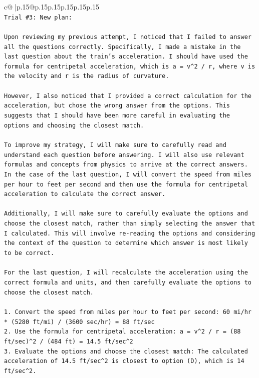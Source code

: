 \documentclass{article}
\begin{document}
{\begin{supertabular}{c@{$\;$}|p{.15\linewidth}@{}p{.15\linewidth}p{.15\linewidth}p{.15\linewidth}p{.15\linewidth}p{.15\linewidth}}
{{{\\ 
\texttt{Trial \#3: New plan: } \\
\\ 
\texttt{Upon reviewing my previous attempt, I noticed that I failed to answer all the questions correctly. Specifically, I made a mistake in the last question about the train's acceleration. I should have used the formula for centripetal acceleration, which is a = v\^{}2 / r, where v is the velocity and r is the radius of curvature. } \\
\\ 
\texttt{However, I also noticed that I provided a correct calculation for the acceleration, but chose the wrong answer from the options. This suggests that I should have been more careful in evaluating the options and choosing the closest match.} \\
\\ 
\texttt{To improve my strategy, I will make sure to carefully read and understand each question before answering. I will also use relevant formulas and concepts from physics to arrive at the correct answers. In the case of the last question, I will convert the speed from miles per hour to feet per second and then use the formula for centripetal acceleration to calculate the correct answer.} \\
\\ 
\texttt{Additionally, I will make sure to carefully evaluate the options and choose the closest match, rather than simply selecting the answer that I calculated. This will involve re{-}reading the options and considering the context of the question to determine which answer is most likely to be correct.} \\
\\ 
\texttt{For the last question, I will recalculate the acceleration using the correct formula and units, and then carefully evaluate the options to choose the closest match.} \\
\\ 
\texttt{1. Convert the speed from miles per hour to feet per second: 60 mi/hr * (5280 ft/mi) / (3600 sec/hr) = 88 ft/sec} \\
\texttt{2. Use the formula for centripetal acceleration: a = v\^{}2 / r = (88 ft/sec)\^{}2 / (484 ft) = 14.5 ft/sec\^{}2} \\
\texttt{3. Evaluate the options and choose the closest match: The calculated acceleration of 14.5 ft/sec\^{}2 is closest to option (D), which is 14 ft/sec\^{}2.} \\
\\ 
}}}
\end{supertabular}}
\end{document}
